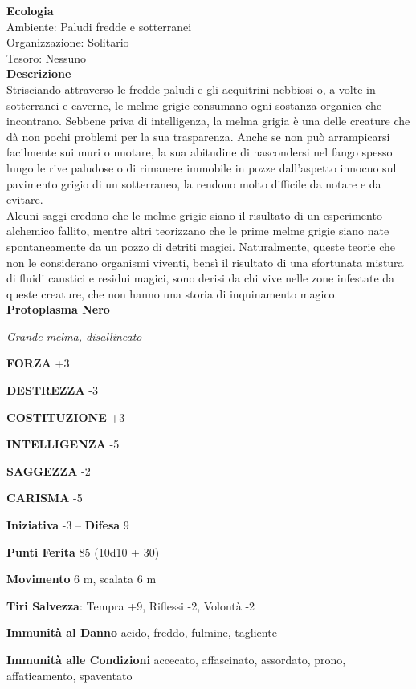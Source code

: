 \begin{multicols}{2}
\textbf{Ecologia}\\
Ambiente: Paludi fredde e sotterranei\\
Organizzazione: Solitario\\
Tesoro: Nessuno\\
\textbf{Descrizione}\\
Strisciando attraverso le fredde paludi e gli acquitrini nebbiosi o, a volte in sotterranei e caverne, le melme grigie consumano ogni sostanza organica che incontrano. Sebbene priva di intelligenza, la melma grigia è una delle creature che dà non pochi problemi per la sua trasparenza. Anche se non può arrampicarsi facilmente sui muri o nuotare, la sua abitudine di nascondersi nel fango spesso lungo le rive paludose o di rimanere immobile in pozze dall'aspetto innocuo sul pavimento grigio di un sotterraneo, la rendono molto difficile da notare e da evitare.\\

Alcuni saggi credono che le melme grigie siano il risultato di un esperimento alchemico fallito, mentre altri teorizzano che le prime melme grigie siano nate spontaneamente da un pozzo di detriti magici. Naturalmente, queste teorie che non le considerano organismi viventi, bensì il risultato di una sfortunata mistura di fluidi caustici e residui magici, sono derisi da chi vive nelle zone infestate da queste creature, che non hanno una storia di inquinamento magico.\\


\medskip{}\textbf{Protoplasma Nero}

\emph{Grande melma, disallineato}

\textbf{FORZA} +3

\textbf{DESTREZZA} -3

\textbf{COSTITUZIONE} +3

\textbf{INTELLIGENZA} -5

\textbf{SAGGEZZA} -2

\textbf{CARISMA} -5

\textbf{Iniziativa} -3 -- \textbf{Difesa} 9

\textbf{Punti Ferita} 85 (10d10 + 30)

\textbf{Movimento} 6 m, scalata 6 m

\textbf{Tiri Salvezza}: Tempra +9, Riflessi -2, Volontà -2

\textbf{Immunità al Danno} acido, freddo, fulmine, tagliente

\textbf{Immunità alle Condizioni} accecato, affascinato, assordato, prono, affaticamento, spaventato


\end{multicols}
